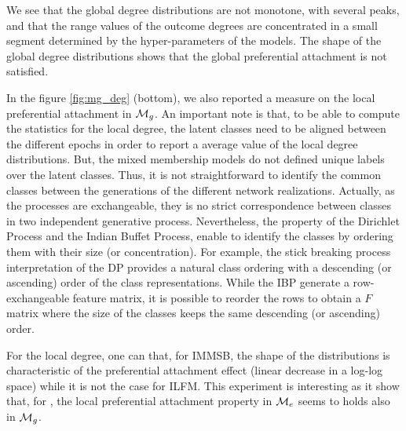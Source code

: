 We see that the global degree distributions are not monotone, with several peaks, and that the range values of the outcome degrees are concentrated in a small segment determined by the hyper-parameters of the models. The shape of the global degree distributions shows that the global preferential attachment is not satisfied. 


In the figure \ref{fig:mg_deg} (bottom), we also reported a measure on the local preferential attachment in $\mathcal{M}_g$. An important note is that, to be able to compute the statistics for the local degree, the latent classes need to be aligned between the different epochs in order to report a average value of the local degree distributions. But, the mixed membership models do not defined unique labels over the latent classes. Thus, it is not straightforward to identify the common classes between the generations of the different network realizations. Actually, as the processes are exchangeable, they is no strict correspondence between classes in two independent generative process. Nevertheless, the property of the Dirichlet Process and the Indian Buffet Process, enable to identify the classes by ordering them with their size (or concentration). For example, the stick breaking process interpretation of the DP provides a natural class ordering with a descending (or ascending) order of the class representations. While the IBP generate a row-exchangeable feature matrix, it is possible to reorder the rows to obtain a $F$ matrix where the size of the classes keeps the same descending (or ascending) order.

For the local degree, one can that, for IMMSB, the shape of the distributions is characteristic of the preferential attachment effect (linear decrease in a log-log space) while it is not the case for ILFM. This experiment is interesting as it show that, for \imb, the local preferential attachment property in $\mathcal{M}_e$ seems to holds also in $\mathcal{M}_g$.




